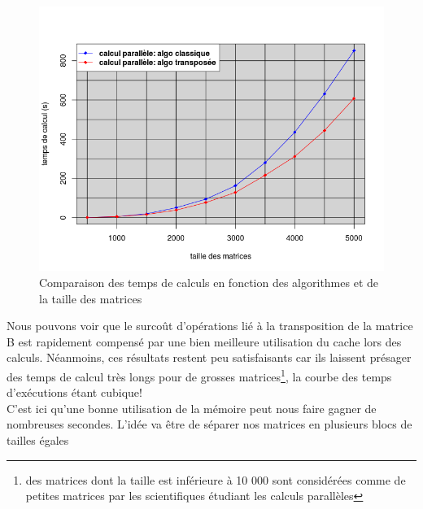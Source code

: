\begin{figure}[hb]

	\begin{center}
	\includegraphics[scale=0.7]{para_transposee_500_5000.png} 
	\end{center}
	\caption{Comparaison des temps de calculs en fonction des algorithmes et de la taille des matrices}
	\label{figure:3.4}

\end{figure}

Nous pouvons voir que le surcoût d'opérations lié à la transposition de la matrice B est rapidement compensé par une bien meilleure utilisation du cache lors des calculs. Néanmoins, ces résultats restent peu satisfaisants car ils laissent présager des temps de calcul très longs pour de grosses matrices\footnote{des matrices dont la taille est inférieure à 10 000 sont considérées comme de petites matrices par les scientifiques étudiant les calculs parallèles}, la courbe des temps d'exécutions étant cubique! \\
C'est ici qu'une bonne utilisation de la mémoire peut nous faire gagner de nombreuses secondes. L'idée va être de séparer nos matrices en plusieurs blocs de tailles égales 


